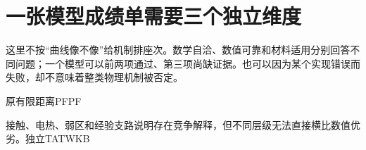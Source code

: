 \documentclass[11pt,a4paper]{article}
\begin{document}
\section{{\cjkfont 一张模型成绩单需要三个独立维度}\allowbreak{}}\label{sec:55}
{\cjkfont 这里不按“曲线像不像”给机制排座次。数学自洽、数值可靠和材料适用分别回答不同问题；一个模型可以前两项通过、第三项尚缺证据。也可以因为某个实现错误而失败，却不意味着整类物理机制被否定。}\allowbreak{}
\par
{\cjkfont 原有限距离}\allowbreak{}PF\allowbreak{}PF\allowbreak{}
\par
{\cjkfont 接触、电热、弱区和经验支路说明存在竞争解释，但不同层级无法直接横比数值优劣。独立}\allowbreak{}TAT\allowbreak{}WKB\allowbreak{}
\par
\end{document}
